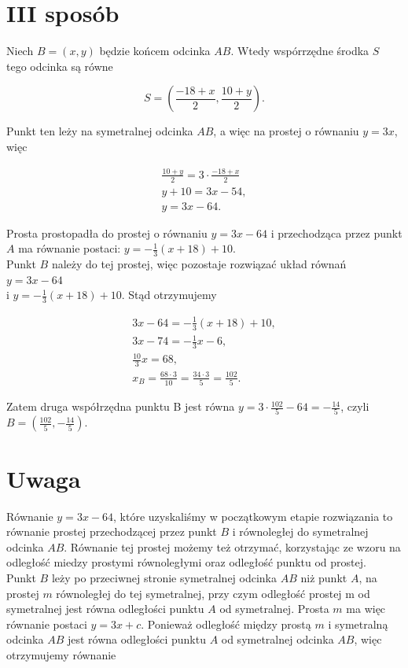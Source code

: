 \documentclass[10pt]{article}
\begin{document}
\section*{III sposób}
Niech $B=(x, y)$ będzie końcem odcinka $A B$. Wtedy wspórrzędne środka $S$ tego odcinka są równe

$$
S=\left(\frac{-18+x}{2}, \frac{10+y}{2}\right) .
$$

Punkt ten leży na symetralnej odcinka $A B$, a więc na prostej o równaniu $y=3 x$, więc

$$
\begin{gathered}
\frac{10+y}{2}=3 \cdot \frac{-18+x}{2} \\
y+10=3 x-54, \\
y=3 x-64 .
\end{gathered}
$$

Prosta prostopadła do prostej o równaniu $y=3 x-64$ i przechodząca przez punkt $A$ ma równanie postaci: $y=-\frac{1}{3}(x+18)+10$.\\
Punkt $B$ należy do tej prostej, więc pozostaje rozwiązać układ równań $y=3 x-64$\\
i $y=-\frac{1}{3}(x+18)+10$. Stąd otrzymujemy

$$
\begin{gathered}
3 x-64=-\frac{1}{3}(x+18)+10, \\
3 x-74=-\frac{1}{3} x-6, \\
\frac{10}{3} x=68, \\
x_{B}=\frac{68 \cdot 3}{10}=\frac{34 \cdot 3}{5}=\frac{102}{5} .
\end{gathered}
$$

Zatem druga współrzędna punktu B jest równa $y=3 \cdot \frac{102}{5}-64=-\frac{14}{5}$, czyli $B=\left(\frac{102}{5},-\frac{14}{5}\right)$.

\section*{Uwaga}
Równanie $y=3 x-64$, które uzyskaliśmy w początkowym etapie rozwiązania to równanie prostej przechodzącej przez punkt $B$ i równoległej do symetralnej odcinka $A B$. Równanie tej prostej możemy też otrzymać, korzystając ze wzoru na odległość miedzy prostymi równoległymi oraz odległość punktu od prostej.\\
Punkt $B$ leży po przeciwnej stronie symetralnej odcinka $A B$ niż punkt $A$, na prostej $m$ równoległej do tej symetralnej, przy czym odległość prostej m od symetralnej jest równa odległości punktu $A$ od symetralnej. Prosta $m$ ma więc równanie postaci $y=3 x+c$. Ponieważ odległość między prostą $m$ i symetralną odcinka $A B$ jest równa odległości punktu $A$ od symetralnej odcinka $A B$, więc otrzymujemy równanie
\end{document}
